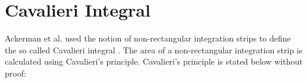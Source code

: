 \documentclass[twoside,reqno,11pt]{fcaa-var} %
\begin{document}
% 
 
 
\section{Cavalieri Integral}
\label{sec:cav_integral}

\noindent
Ackerman et al. used the notion of non-rectangular integration strips to define the so called Cavalieri integral \cite{ackermann12}. The area of a non-rectangular 
integration strip is calculated using Cavalieri's principle. Cavalieri's principle is stated below without proof:
\end{document}
